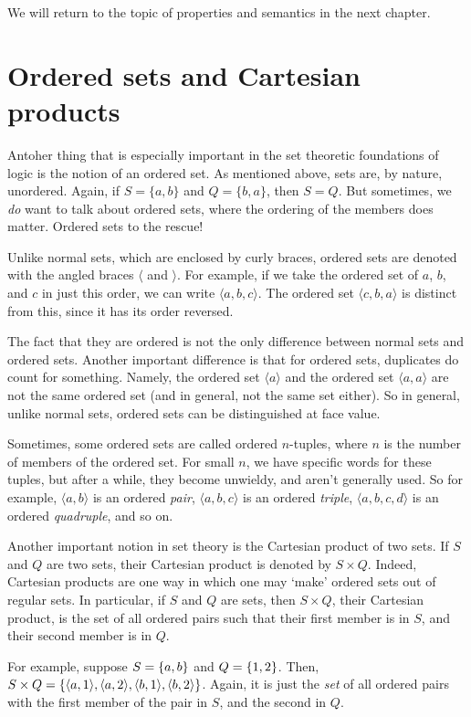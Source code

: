We will return to the topic of properties and semantics in the next chapter. 

\section{Ordered sets and Cartesian products}

Antoher thing that is especially important in the set theoretic foundations of logic is the notion of an ordered set. As mentioned above, sets are, by nature, unordered. Again, if $S=\{a, b\}$ and $Q=\{b, a\}$, then $S=Q$. But sometimes, we \textit{do} want to talk about ordered sets, where the ordering of the members does matter. Ordered sets to the rescue! 

Unlike normal sets, which are enclosed by curly braces, ordered sets are denoted with the angled braces $\langle$ and $\rangle$. For example, if we take the ordered set of $a$, $b$, and $c$ in just this order, we can write $\langle a, b, c \rangle$. The ordered set $\langle c, b, a \rangle$ is distinct from this, since it has its order reversed. 

The fact that they are ordered is not the only difference between normal sets and ordered sets. Another important difference is that for ordered sets, duplicates do count for something. Namely, the ordered set $\langle a \rangle$ and the ordered set $\langle a, a\rangle$ are not the same ordered set (and in general, not the same set either). So in general, unlike normal sets, ordered sets can be distinguished at face value. 

Sometimes, some ordered sets are called ordered $n$-tuples, where $n$ is the number of members of the ordered set. For small $n$, we have specific words for these tuples, but after a while, they become unwieldy, and aren't generally used. So for example, $\langle a, b \rangle$ is an ordered \textit{pair}, $\langle a, b, c \rangle$ is an ordered \textit{triple}, $\langle a, b, c, d \rangle$ is an ordered \textit{quadruple}, and so on. 

Another important notion in set theory is the Cartesian product of two sets. If $S$ and $Q$ are two sets, their Cartesian product is denoted by $S \times Q$. Indeed, Cartesian products are one way in which one may `make' ordered sets out of regular sets. In particular, if $S$ and $Q$ are sets, then $S \times Q$, their Cartesian product, is the set of all ordered pairs such that their first member is in $S$, and their second member is in $Q$. 

For example, suppose $S=\{a, b\}$ and $Q=\{1, 2\}$. Then, $S \times Q=\{\langle a, 1\rangle, \langle a, 2\rangle, \langle b, 1\rangle, \langle b, 2\rangle\}$. Again, it is just the \textit{set} of all ordered pairs with the first member of the pair in $S$, and the second in $Q$. 

